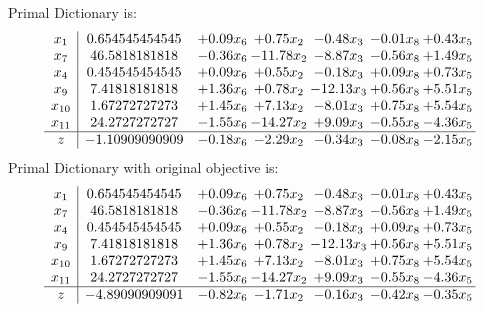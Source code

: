 \documentclass[9pt]{article}
\begin{document}
Primal Dictionary is:
\[\begin{array}{c| c c@{\hskip 2pt} c@{\hskip 2pt} c@{\hskip 2pt} c@{\hskip 2pt} c@{\hskip 2pt} }
 x_{1}   &  0.654545454545 & +  0.09 x_{6} & +  0.75 x_{2} & -0.48 x_{3} & -0.01 x_{8} & +  0.43 x_{5}\\
 x_{7}   &  46.5818181818 & -0.36 x_{6} & -11.78 x_{2} & -8.87 x_{3} & -0.56 x_{8} & +  1.49 x_{5}\\
 x_{4}   &  0.454545454545 & +  0.09 x_{6} & +  0.55 x_{2} & -0.18 x_{3} & +  0.09 x_{8} & +  0.73 x_{5}\\
 x_{9}   &  7.41818181818 & +  1.36 x_{6} & +  0.78 x_{2} & -12.13 x_{3} & +  0.56 x_{8} & +  5.51 x_{5}\\
 x_{10}   &  1.67272727273 & +  1.45 x_{6} & +  7.13 x_{2} & -8.01 x_{3} & +  0.75 x_{8} & +  5.54 x_{5}\\
 x_{11}   &  24.2727272727 & -1.55 x_{6} & -14.27 x_{2} & +  9.09 x_{3} & -0.55 x_{8} & -4.36 x_{5}\\
\hline
z    &  -1.10909090909 & -0.18 x_{6} & -2.29 x_{2} & -0.34 x_{3} & -0.08 x_{8} & -2.15 x_{5}\\
\end{array}\]
Primal Dictionary with original objective is:
\[\begin{array}{c| c c@{\hskip 2pt} c@{\hskip 2pt} c@{\hskip 2pt} c@{\hskip 2pt} c@{\hskip 2pt} }
 x_{1}   &  0.654545454545 & +  0.09 x_{6} & +  0.75 x_{2} & -0.48 x_{3} & -0.01 x_{8} & +  0.43 x_{5}\\
 x_{7}   &  46.5818181818 & -0.36 x_{6} & -11.78 x_{2} & -8.87 x_{3} & -0.56 x_{8} & +  1.49 x_{5}\\
 x_{4}   &  0.454545454545 & +  0.09 x_{6} & +  0.55 x_{2} & -0.18 x_{3} & +  0.09 x_{8} & +  0.73 x_{5}\\
 x_{9}   &  7.41818181818 & +  1.36 x_{6} & +  0.78 x_{2} & -12.13 x_{3} & +  0.56 x_{8} & +  5.51 x_{5}\\
 x_{10}   &  1.67272727273 & +  1.45 x_{6} & +  7.13 x_{2} & -8.01 x_{3} & +  0.75 x_{8} & +  5.54 x_{5}\\
 x_{11}   &  24.2727272727 & -1.55 x_{6} & -14.27 x_{2} & +  9.09 x_{3} & -0.55 x_{8} & -4.36 x_{5}\\
\hline
z    &  -4.89090909091 & -0.82 x_{6} & -1.71 x_{2} & -0.16 x_{3} & -0.42 x_{8} & -0.35 x_{5}\\
\end{array}\]
\end{document}

